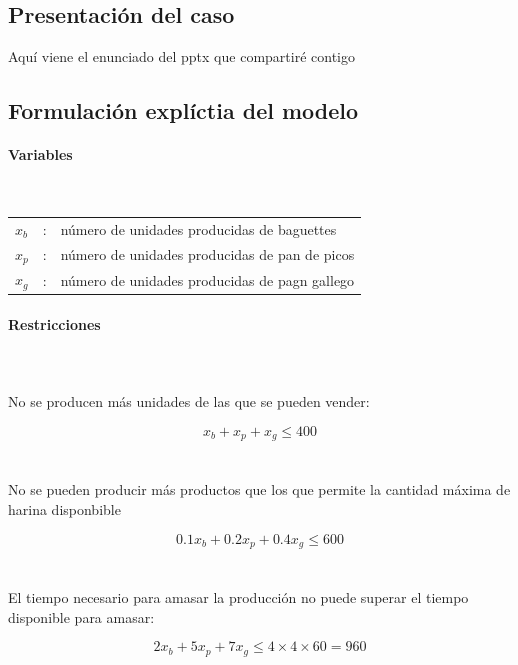 \subsection{Presentación del caso}

Aquí viene el enunciado del pptx que compartiré contigo


\newpage
\subsection{Formulación explíctia del modelo}

\paragraph{Variables}\mbox{}\\

\begin{tabular}{l c l}
    $x_b$  & : & número de unidades producidas de baguettes\\
    $x_p$  & : & número de unidades producidas de pan de picos\\
    $x_g$  & : & número de unidades producidas de pagn gallego\\
\end{tabular}

\paragraph{Restricciones}\mbox{}\\
\\
No se producen más unidades de las que se pueden vender:

\begin{equation}
    x_b + x_p + x_g \leq 400
\end{equation}
\\
\\
No se pueden producir más productos que los que permite la cantidad máxima de harina disponbible

\begin{equation}
    0.1x_b + 0.2x_p + 0.4x_g \leq 600
\end{equation}
\\
\\
El tiempo necesario para amasar la producción no puede superar el tiempo disponible para amasar:


\begin{equation}
    2x_b + 5x_p + 7x_g \leq 4\times4\times 60 = 960
\end{equation}
\\
\\
